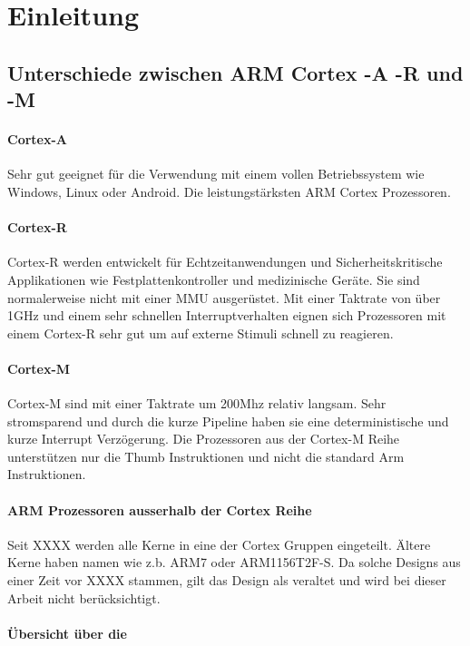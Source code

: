 \chapter{Einleitung}

\section{Unterschiede zwischen ARM Cortex -A -R und -M}
\subsubsection{Cortex-A}
Sehr gut geeignet für die Verwendung mit einem vollen Betriebssystem wie Windows, Linux oder Android.
Die leistungstärksten ARM Cortex Prozessoren.


\subsubsection{Cortex-R}
Cortex-R werden entwickelt für Echtzeitanwendungen und Sicherheitskritische Applikationen wie Festplattenkontroller und medizinische Geräte.
Sie sind normalerweise nicht mit einer MMU ausgerüstet.
Mit einer Taktrate von über 1GHz und einem sehr schnellen Interruptverhalten eignen sich Prozessoren mit einem Cortex-R sehr gut um auf externe Stimuli schnell zu reagieren.

\subsubsection{Cortex-M}
Cortex-M sind mit einer Taktrate um 200Mhz relativ langsam.
Sehr stromsparend und durch die kurze Pipeline haben sie eine deterministische und kurze Interrupt Verzögerung.
Die Prozessoren aus der Cortex-M Reihe unterstützen nur die Thumb Instruktionen und nicht die standard Arm Instruktionen.


\subsubsection{ARM Prozessoren ausserhalb der Cortex Reihe}
Seit XXXX werden alle Kerne in eine der Cortex Gruppen eingeteilt.
Ältere Kerne haben namen wie z.b. ARM7 oder ARM1156T2F-S.
Da solche Designs aus einer Zeit vor XXXX stammen, gilt das Design als veraltet und wird bei dieser Arbeit nicht berücksichtigt.	%


\subsubsection{Übersicht über die}

